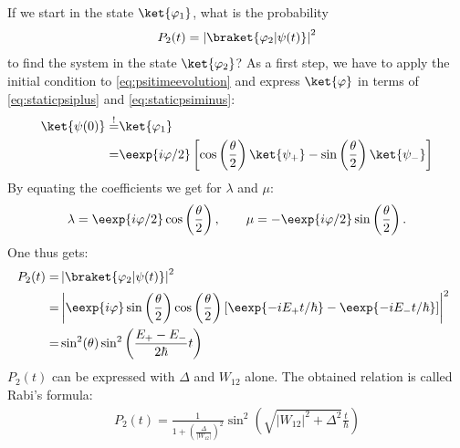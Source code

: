 				If we start in the state $\ket{\varphi_1}$, what is the probability
				\begin{align}
					P_2(t)=\left|\braket{\varphi_2|\psi(t)}\right|^2
				\end{align}
				to find the system in the state $\ket{\varphi_2}$? As a first step, we have to apply the initial condition to \eqref{eq:psitimeevolution} and express $\ket{\varphi}$ in terms of \eqref{eq:staticpsiplus} and \eqref{eq:staticpsiminus}:
				\begin{align}
					\ket{\psi(0)} \overset{!}{=}& \ket{\varphi_1}\\
											  = & \eexp{i{\varphi}/{2}} \left[ \cos\left( \frac{\theta}{2}\right) \ket{\psi_+}-\sin\left(\frac{\theta}{2}\right)\ket{\psi_-}\right]
				\end{align}
				By equating the coefficients we get for $\lambda$ and $\mu$:
				\begin{align}
					\lambda = \eexp{i{\varphi}/{2}}\cos\left(\frac{\theta}{2}\right), \qquad  \mu = -\eexp{i{\varphi}/{2}}\sin\left(\frac{\theta}{2}\right).
				\end{align}
				One thus gets:
				\begin{align}
					\hspace{-2mm} P_2(t)	=&\left|\braket{\varphi_2|\psi(t)}\right|^2 \\
											=& \left|\eexp{i\varphi} \sin\left(\frac{\theta}{2}\right)\cos\left(\frac{\theta}{2}\right)\left[\eexp{-i{E_+}t/{\hbar}} - \eexp{-i{E_-}t/{\hbar}}\right]\right|^2\\
											=& \sin^2(\theta)\sin^2\left(\frac{E_+-E_-}{2\hbar}t\right)
				\end{align}
$P_2(t)$ can be expressed with $\Delta$ and $W_{12}$ alone. The obtained relation is called Rabi's formula:
\begin{align}
 P_2(t)=\frac{1}{1+\left(\frac{\Delta}{|W_{12}|}\right)^2}\sin^2\left(\sqrt{|W_{12}|^2+\Delta^2}\frac{t}{\hbar}\right)
\end{align}